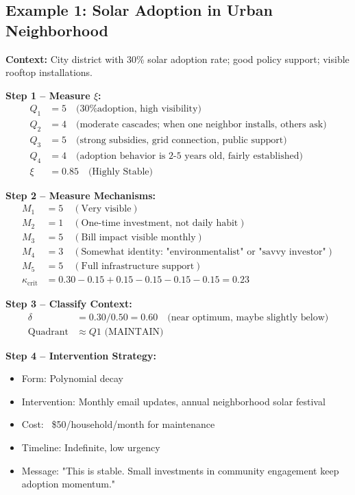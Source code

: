 \documentclass[11pt, a4paper]{article}
\begin{document}
\subsection{Example 1: Solar Adoption in Urban Neighborhood}

\textbf{Context:} City district with 30\% solar adoption rate; good policy support;
visible rooftop installations.

\textbf{Step 1 – Measure $\xi$:}
\begin{align}
Q_1 &= 5 \quad \text{(30\% adoption, high visibility)} \\
Q_2 &= 4 \quad \text{(moderate cascades; when one neighbor installs, others ask)} \\
Q_3 &= 5 \quad \text{(strong subsidies, grid connection, public support)} \\
Q_4 &= 4 \quad \text{(adoption behavior is 2-5 years old, fairly established)} \\
\xi &= 0.85 \quad \text{(Highly Stable)}
\end{align}

\textbf{Step 2 – Measure Mechanisms:}
\begin{align}
M_1 &= 5 \quad (\text{Very visible}) \\
M_2 &= 1 \quad (\text{One-time investment, not daily habit}) \\
M_3 &= 5 \quad (\text{Bill impact visible monthly}) \\
M_4 &= 3 \quad (\text{Somewhat identity: "environmentalist" or "savvy investor"}) \\
M_5 &= 5 \quad (\text{Full infrastructure support}) \\
\kappa_{\text{crit}} &= 0.30 - 0.15 + 0.15 - 0.15 - 0.15 - 0.15 = 0.23
\end{align}

\textbf{Step 3 – Classify Context:}
\begin{align}
\delta &= 0.30 / 0.50 = 0.60 \quad \text{(near optimum, maybe slightly below)} \\
\text{Quadrant} &\approx Q1 \text{ (MAINTAIN)}
\end{align}

\textbf{Step 4 – Intervention Strategy:}
\begin{itemize}
    \item Form: Polynomial decay
    \item Intervention: Monthly email updates, annual neighborhood solar festival
    \item Cost: ~\$50/household/month for maintenance
    \item Timeline: Indefinite, low urgency
    \item Message: "This is stable. Small investments in community engagement keep adoption momentum."
\end{itemize}
\end{document}
